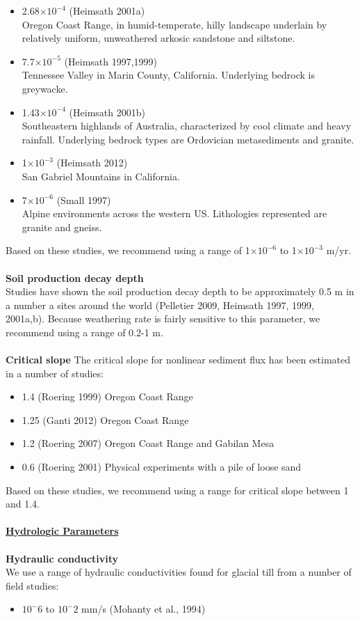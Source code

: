\documentclass[12pt]{article}
\begin{document}
{\begin{itemize}
  \item 2.68$\times10^{-4}$ (Heimsath 2001a)
\\
Oregon Coast Range, in humid-temperate, hilly landscape underlain by relatively uniform, unweathered arkosic
sandstone and siltstone. 
  \item 7.7$\times10^{-5}$ (Heimsath 1997,1999)
\\
Tennessee Valley in Marin County, California. Underlying bedrock is greywacke. 
  \item 1.43$\times10^{-4}$ (Heimsath 2001b)
\\Southeastern highlands of Australia, characterized by cool climate and heavy rainfall. Underlying bedrock types are Ordovician metasediments and granite. 
  \item 1$\times10^{-3}$ (Heimsath 2012)
\\San Gabriel Mountains in California. 
  \item 7$\times10^{-6}$ (Small 1997)
\\Alpine environments across the western US. Lithologies represented are granite and gneiss. 
\end{itemize}
\noindent
Based on these studies, we recommend using a range of 1$\times10^{-6}$ to 1$\times10^{-3}$ m/yr.
\\
\\
\noindent
{\textbf{Soil production decay depth}}
\\
Studies have shown the soil production decay depth to be approximately 0.5 m in a number a sites around the world (Pelletier 2009, Heimsath 1997, 1999, 2001a,b). Because weathering rate is fairly sensitive to this parameter, we recommend using a range of 0.2-1 m.  
\\
\\
\noindent
{\textbf{Critical slope}}
The critical slope for nonlinear sediment flux has been estimated in a number of studies:

\begin{itemize}
\item 1.4 (Roering 1999)
Oregon Coast Range

\item 1.25 (Ganti 2012)
Oregon Coast Range

\item 1.2 (Roering 2007)
Oregon Coast Range and Gabilan Mesa

\item 0.6 (Roering 2001) 
Physical experiments with a pile of loose sand
\end{itemize}
\noindent
Based on these studies, we recommend using a range for critical slope between 1 and 1.4. 
\\
\\
\noindent
{\textbf{\Large{\underline{Hydrologic Parameters}}}}
\\
\\
{\textbf{Hydraulic conductivity}}
\\
\noindent
We use a range of hydraulic conductivities found for glacial till from a number of field studies: 
\noindent
\begin{itemize}
\item $10^-6$ to $10^-2$ mm/s (Mohanty et al., 1994)


\end{itemize}}
\end{document}

